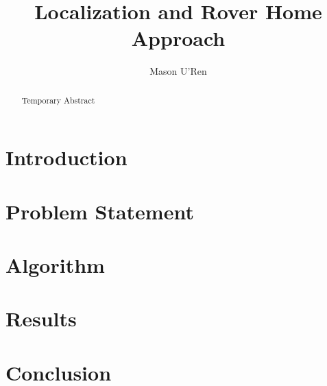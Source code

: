 \documentclass[letterpaper, 10pt, conference]{ieeeconf}
\title{Localization and Rover Home Approach}
\author{Mason U'Ren}
\begin{document}
	
\maketitle

\begin{abstract}
Temporary Abstract
\end{abstract}


\section{Introduction}


\section{Problem Statement}


\section{Algorithm}



\section{Results}



\section{Conclusion}





%
\end{document}
